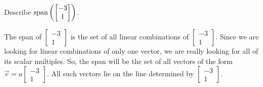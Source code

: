 \documentclass{ximera}
\begin{document}
\begin{example}
Describe $\textnormal{span}\left(\begin{bmatrix}-3\\1\end{bmatrix}\right)$.
\begin{explanation}
The span of $\begin{bmatrix}-3\\1\end{bmatrix}$ is the set of all linear combinations of $\begin{bmatrix}-3\\1\end{bmatrix}$.  Since we are looking for linear combinations of only one vector, we are really looking for all of its scalar multiples.  So, the span will be the set of all vectors of the form $\vec{v}=a\begin{bmatrix}-3\\1\end{bmatrix}$.  All such vectors lie on the line determined by $\begin{bmatrix}-3\\1\end{bmatrix}$.

\begin{image}[3.5in]
\end{image}


\end{explanation}
\end{example}
\end{document}
